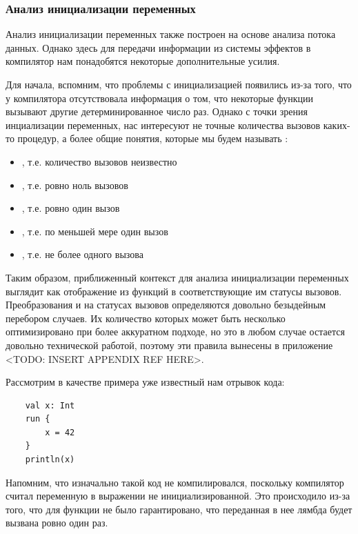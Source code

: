 \subsubsection{Анализ инициализации переменных}

Анализ инициализации переменных также построен на основе анализа потока данных. Однако здесь для передачи информации из системы эффектов в компилятор нам понадобятся некоторые дополнительные усилия.

Для начала, вспомним, что проблемы с инициализацией появились из-за того, что у компилятора отсутствовала информация о том, что некоторые функции вызывают другие детерминированное число раз. Однако с точки зрения инциализации переменных, нас интересуют не точные количества вызовов каких-то процедур, а более общие понятия, которые мы будем называть :

\begin{itemize}
	\item {}, т.е. количество вызовов неизвестно
	
	\item {}, т.е. ровно ноль вызовов
	
	\item {}, т.е. ровно один вызов
	
	\item {}, т.е. по меньшей мере один вызов
	
	\item {}, т.е. не более одного вызова
\end{itemize}

Таким образом, приближенный контекст для анализа инициализации переменных выглядит как отображение из функций в соответствующие им статусы вызовов. Преобразования  и  на статусах вызовов определяются довольно безыдейным перебором случаев. Их количество которых может быть несколько оптимизировано при более аккуратном подходе, но это в любом случае остается довольно технической работой, поэтому эти правила вынесены в приложение <TODO: INSERT APPENDIX REF HERE>.

Рассмотрим в качестве примера уже известный нам отрывок кода:

\begin{verbatim}
	val x: Int
	run {
		x = 42
	}
	println(x)
\end{verbatim}

Напомним, что изначально такой код не компилировался, поскольку компилятор считал переменную  в выражении  не инициализированной. Это происходило из-за того, что для функции  не было гарантировано, что переданная в нее лямбда  будет вызвана ровно один раз.

